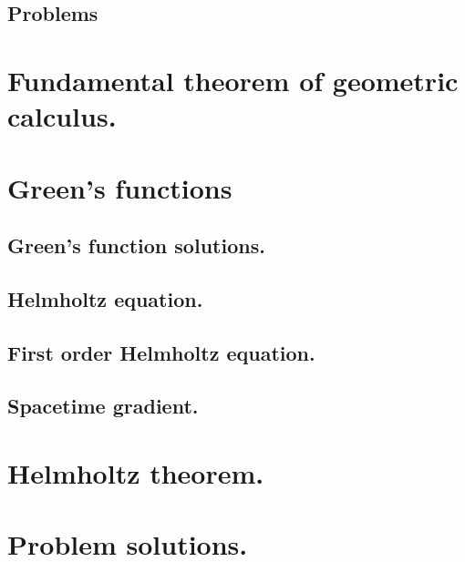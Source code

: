       \subsection{Problems}
         
         

   \section{Fundamental theorem of geometric calculus.}
      
   \section{Green's functions}
      
      \subsection{Green's function solutions.}
         
      \subsection{Helmholtz equation.}
         
      \subsection{First order Helmholtz equation.}
         
      \subsection{Spacetime gradient.}
         
   \section{Helmholtz theorem.}
      
      
   \section{Problem solutions.}
      \shipoutAnswer
